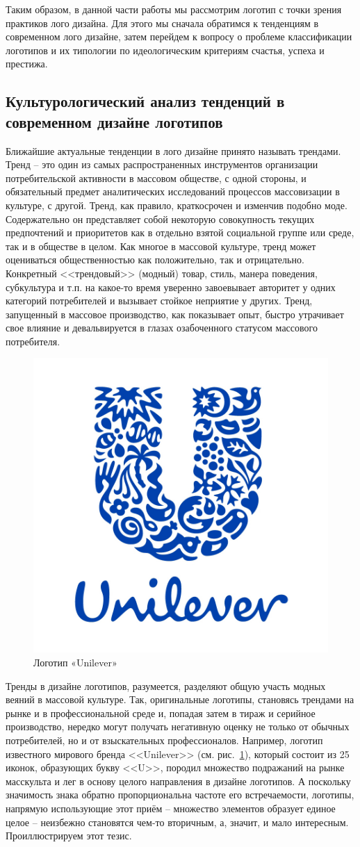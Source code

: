 Таким образом, в данной части работы мы рассмотрим логотип с точки зрения практиков лого
дизайна. Для этого мы сначала обратимся к тенденциям в современном лого дизайне, затем перейдем к
вопросу о проблеме классификации логотипов и их типологии по идеологическим критериям счастья,
успеха и престижа.

\subsection{Культурологический анализ тенденций в современном дизайне логотипов}
Ближайшие актуальные тенденции в лого дизайне принято называть трендами. Тренд -- это один из самых распространенных инструментов организации потребительской активности в массовом обществе, с одной стороны, и обязательный предмет аналитических исследований процессов массовизации в культуре, с другой. Тренд, как правило, краткосрочен и изменчив подобно моде. Содержательно он представляет собой некоторую совокупность текущих предпочтений и приоритетов как в отдельно взятой социальной группе или среде, так и в обществе в целом. Как многое в массовой культуре, тренд может оцениваться общественностью как положительно, так и отрицательно. Конкретный <<трендовый>> (модный) товар, стиль, манера поведения, субкультура и т.п. на какое-то время уверенно завоевывает авторитет у одних категорий потребителей и вызывает стойкое неприятие у других. Тренд, запущенный в массовое производство, как показывает опыт, быстро утрачивает свое влияние и девальвируется в глазах озабоченного статусом массового потребителя.  

\begin{figure}
  \centering
  \includegraphics[width=.3\linewidth]{images/unilever}
  \caption{Логотип «Unilever»}
  \label{fig:unilever}
\end{figure}

Тренды в дизайне логотипов, разумеется, разделяют общую участь модных веяний в массовой культуре. Так, оригинальные логотипы, становясь трендами на рынке и в профессиональной среде и, попадая затем в тираж и серийное производство, нередко могут получать негативную оценку не только от обычных потребителей, но и от взыскательных профессионалов. Например, логотип известного мирового бренда <<Unilever>> (см. рис.~\ref{fig:unilever}), который состоит из 25 иконок, образующих букву <<U>>, породил множество подражаний на рынке масскульта и лег в основу целого направления в дизайне логотипов. А поскольку значимость знака обратно пропорциональна частоте его встречаемости, логотипы, напрямую использующие этот приём -- множество элементов образует единое целое -- неизбежно становятся чем-то вторичным, а, значит, и мало интересным. Проиллюстрируем этот тезис.

